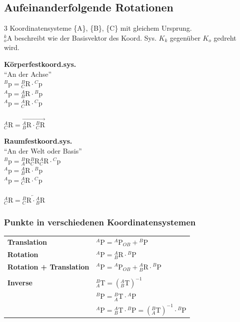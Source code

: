 \begin{minipage}{0.49\linewidth}
\subsection{Aufeinanderfolgende Rotationen}
3 Koordinatensysteme \{A\}, \{B\}, \{C\} mit gleichem Ursprung.\\
${}^k_o\mathrm{A}$ beschreibt wie der Basisvektor des Koord. Sys. $K_k$ gegenüber $K_o$ gedreht wird.\newline
\begin{minipage}{0.49\linewidth}
    \textbf{Körperfestkoord.sys.}\\
    "`An der Achse"'\\
    ${}^B\mathrm{p}={}^B_C\mathrm{R}\cdot{}^C\mathrm{p}$\\
    ${}^A\mathrm{p}={}^A_B\mathrm{R}\cdot{}^B\mathrm{p}$\\
    ${}^A\mathrm{p}={}^A_C\mathrm{R}\cdot{}^C\mathrm{p}$\\ \\
    ${}^A_C\mathrm{R}=\overrightarrow{{}^A_B\mathrm{R} \cdot {}^B_C\mathrm{R}}$\\
\end{minipage}
\begin{minipage}{0.49\linewidth}
    \textbf{Raumfestkoord.sys.}\\ 
    "`An der Welt oder Basis"'\\
    ${}^B\mathrm{p}={}^B_A\mathrm{R}{}^B_C\mathrm{R}{}^A_C\mathrm{R}\cdot{}^C\mathrm{p}$\\
    ${}^A\mathrm{p}={}^A_B\mathrm{R}\cdot{}^B\mathrm{p}$\\
    ${}^A\mathrm{p}={}^A_C\mathrm{R}\cdot{}^C\mathrm{p}$\\ \\
    ${}^A_C\mathrm{R}=\overleftarrow{{}^B_C\mathrm{R} \cdot {}^A_B\mathrm{R}}$\\
\end{minipage}   
\end{minipage}\quad
\begin{minipage}{0.5\linewidth}
\subsubsection{Punkte in verschiedenen Koordinatensystemen }
\begin{tabular}{ll}
    \textbf{Translation}&${}^A\mathrm{P} = {}^A\mathrm{P}_{OB}+{}^B\mathrm{P} $ \\
    \textbf{Rotation} & ${}^A\mathrm{P} = {}^A_B\mathrm{R}\cdot {}^B\mathrm{P} $\\
    \textbf{Rotation + Translation}&$ {}^A\mathrm{P} = {}^A\mathrm{P}_{OB} +{}^A_B\mathrm{R}\cdot {}^B\mathrm{P} $\\
    &\\
    \textbf{Inverse}&${}^B_A\mathrm{T}=({}^A_B\mathrm{T})^{-1}$\\
    &${}^B\mathrm{P}={}^B_A\mathrm{T}\cdot{}^A\mathrm{P}$ \\
    &${}^A\mathrm{P}={}^A_B\mathrm{T}\cdot{}^B\mathrm{P}=({}^B_A\mathrm{T})^{-1}\cdot{}^B\mathrm{P}$
\end{tabular}
\end{minipage}
